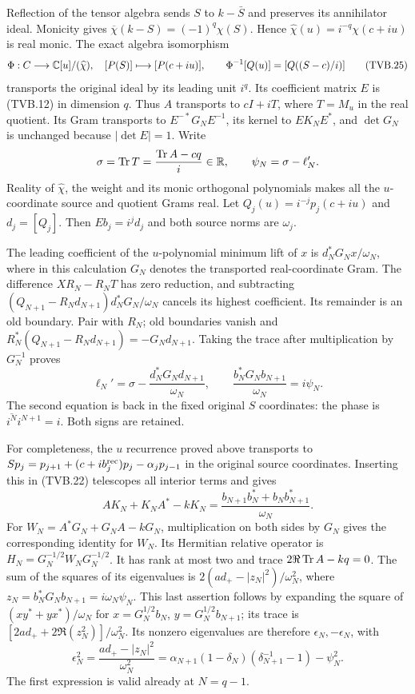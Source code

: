 Reflection of the tensor algebra sends $S$ to $k-\bar S$ and
preserves its annihilator ideal. Monicity gives
$\overline\chi(k-S)=(-1)^q\chi(S)$. Hence
$\widehat\chi(u)=i^{-q}\chi(c+iu)$ is real monic. The exact
algebra isomorphism
\[
 \Phi:C\longrightarrow\mathbb C[u]/(\widehat\chi),\quad
 [P(S)]\longmapsto[P(c+iu)],\qquad
 \Phi^{-1}[Q(u)]=[Q((S-c)/i)]
 \tag{TVB.25}
\]
transports the original ideal by its leading unit $i^q$.
Its coefficient matrix $E$ is (TVB.12) in dimension $q$.
Thus $A$ transports to $cI+iT$, where $T=M_u$ in the real
quotient. Its Gram transports to $E^{-*}G_NE^{-1}$,
its kernel to $EK_NE^*$, and $\det G_N$ is unchanged because
$|\det E|=1$. Write
\[
 \sigma=\operatorname{Tr} T=\frac{\operatorname{Tr} A-cq}{i}\in\mathbb R,
 \qquad\psi_N=\sigma-\ell_N'.
\]
Reality of $\widehat\chi$, the weight and its monic orthogonal
polynomials makes all the $u$-coordinate source and quotient
Grams real. Let $Q_j(u)=i^{-j}p_j(c+iu)$ and $d_j=[Q_j]$.
Then $Eb_j=i^jd_j$ and both source norms are $\omega_j$.

The leading coefficient of the $u$-polynomial minimum lift of
$x$ is $d_N^*G_Nx/\omega_N$, where in this calculation $G_N$
denotes the transported real-coordinate Gram. The difference
$XR_N-R_NT$ has zero reduction, and subtracting
$(Q_{N+1}-R_Nd_{N+1})d_N^*G_N/\omega_N$ cancels its highest
coefficient. Its remainder is an old boundary. Pair with $R_N$;
old boundaries vanish and
$R_N^*(Q_{N+1}-R_Nd_{N+1})=-G_Nd_{N+1}$.
Taking the trace after multiplication by $G_N^{-1}$ proves
\[
 \ell_N'=\sigma-
           \frac{d_N^*G_Nd_{N+1}}{\omega_N},\qquad
 \frac{b_N^*G_Nb_{N+1}}{\omega_N}=i\psi_N.
 \tag{TVB.26}
\]
The second equation is back in the fixed original $S$ coordinates:
the phase is $\overline{i^N}i^{N+1}=i$. Both signs are retained.

For completeness, the $u$ recurrence proved above transports to
$Sp_j=p_{j+1}+(c+ib_j^{\rm rec})p_j
-\alpha_jp_{j-1}$ in the original source coordinates.
Inserting this in (TVB.22) telescopes all interior terms and gives
\[
 AK_N+K_NA^*-kK_N
 =\frac{b_{N+1}b_N^*+b_Nb_{N+1}^*}{\omega_N}.
\]
For $W_N=A^*G_N+G_NA-kG_N$, multiplication on both sides by
$G_N$ gives the corresponding identity for $W_N$.
Its Hermitian relative operator is
$H_N=G_N^{-1/2}W_NG_N^{-1/2}$.
It has rank at most two and trace
$2\Re\operatorname{Tr} A-kq=0$. The sum of the squares of its eigenvalues
is $2(ad_+-|z_N|^2)/\omega_N^2$, where
$z_N=b_N^*G_Nb_{N+1}=i\omega_N\psi_N$.
This last assertion follows by expanding the square of
$(xy^*+yx^*)/\omega_N$ for
$x=G_N^{1/2}b_N$, $y=G_N^{1/2}b_{N+1}$; its trace is
$[2ad_++2\Re(z_N^2)]/\omega_N^2$.
Its nonzero eigenvalues are therefore $\epsilon_N,-\epsilon_N$,
with
\[
 \epsilon_N^2=\frac{ad_+-|z_N|^2}{\omega_N^2}
 =\alpha_{N+1}(1-\delta_N)(\delta_{N+1}^{-1}-1)-\psi_N^2.
 \tag{TVB.27}
\]
The first expression is valid already at $N=q-1$.

